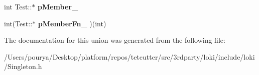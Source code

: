 \begin{DoxyCompactItemize}
\item 
\hypertarget{unionLoki_1_1CreateStatic_1_1MaxAlign_aaebe9e67f03b174a2a804817ca85db60}{}int Test\+::$\ast$ {\bfseries p\+Member\+\_\+}\label{unionLoki_1_1CreateStatic_1_1MaxAlign_aaebe9e67f03b174a2a804817ca85db60}

\item 
\hypertarget{unionLoki_1_1CreateStatic_1_1MaxAlign_a6911f611b06eb1855afaa5d52033578f}{}int(Test\+::$\ast$ {\bfseries p\+Member\+Fn\+\_\+} )(int)\label{unionLoki_1_1CreateStatic_1_1MaxAlign_a6911f611b06eb1855afaa5d52033578f}

\end{DoxyCompactItemize}


The documentation for this union was generated from the following file\+:\begin{DoxyCompactItemize}
\item 
/\+Users/pourya/\+Desktop/platform/repos/tetcutter/src/3rdparty/loki/include/loki/Singleton.\+h\end{DoxyCompactItemize}
